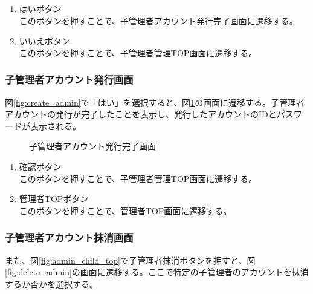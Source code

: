 \documentclass[a4j]{jarticle}
\begin{document}
\begin{enumerate}
  \renewcommand{\labelenumi}{\textcircled{\scriptsize \theenumi}}
\item はいボタン\\
  このボタンを押すことで、子管理者アカウント発行完了画面に遷移する。
\item いいえボタン\\
  このボタンを押すことで、子管理者管理TOP画面に遷移する。
\end{enumerate}

\subsubsection{子管理者アカウント発行画面}
図\ref{fig:create_admin}で「はい」を選択すると、図\ref{fig:new_admin}の画面に遷移する。子管理者アカウントの発行が完了したことを表示し、発行したアカウントのIDとパスワードが表示される。

\begin{figure}[H]
\centering
{}
\caption{子管理者アカウント発行完了画面}
\label{fig:new_admin}
\end{figure}

\begin{enumerate}
  \renewcommand{\labelenumi}{\textcircled{\scriptsize \theenumi}}
\item 確認ボタン\\
  このボタンを押すことで、子管理者管理TOP画面に遷移する。
\item 管理者TOPボタン\\
  このボタンを押すことで、管理者TOP画面に遷移する。
\end{enumerate}



\subsubsection{子管理者アカウント抹消画面}
また、図\ref{fig:admin_child_top}で子管理者抹消ボタンを押すと、図\ref{fig:delete_admin}の画面に遷移する。ここで特定の子管理者のアカウントを抹消するか否かを選択する。
\end{document}
